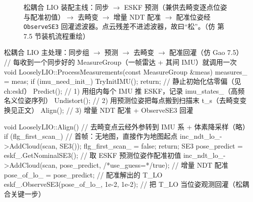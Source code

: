 \begin{figure}[ht]
\centering
{}
\caption{松耦合 LIO 装配主线：同步 $\to$ ESKF 预测（兼供去畸变逐点位姿与配准初值）$\to$ 去畸变 $\to$ 增量 NDT 配准 $\to$ 配准位姿经 \texttt{ObserveSE3} 回灌滤波器。点云残差不进滤波器，故曰“松”。（仿 \cite{gao2023slamad} 第 7.5 节装机流程重绘）}
\label{fig:lidar-loose-lio}
\end{figure}

\begin{codebox}[C++]{松耦合 LIO 主处理：同步组 $\to$ 预测 $\to$ 去畸变 $\to$ 配准回灌（仿 Gao 7.5）}
// 每收到一个同步好的 MeasureGroup（一帧雷达 + 其间 IMU）就调用一次
void LooselyLIO::ProcessMeasurements(const MeasureGroup &meas) {
  measures_ = meas;
  if (imu_need_init_) { TryInitIMU(); return; }  // 静止初始化估零偏（见 ch:eskf）
  Predict();      // 1) 用组内每个 IMU 推 ESKF，记录 imu_states_（高频名义位姿序列）
  Undistort();    // 2) 用预测位姿把每点搬到扫描末 t_s（去畸变变换见正文）
  Align();        // 3) 增量 NDT 配准 + ObserveSE3 回灌
}

void LooselyLIO::Align() {
  // 去畸变点云经外参转到 IMU 系 + 体素降采样（略）
  if (flg_first_scan_) {            // 首帧：无地图，直接作为地图起点
    inc_ndt_lo_->AddCloud(scan, SE3());  flg_first_scan_ = false;  return;
  }
  SE3 pose_predict = eskf_.GetNominalSE3();       // 取 ESKF 预测位姿作配准初值
  inc_ndt_lo_->AddCloud(scan, pose_predict, /*use_guess=*/true);   // 增量 NDT 配准
  pose_of_lo_ = pose_predict;                     // 配准解出的 T_LO
  eskf_.ObserveSE3(pose_of_lo_, 1e-2, 1e-2);      // 把 T_LO 当位姿观测回灌（松耦合关键一步）
}
\end{codebox}

